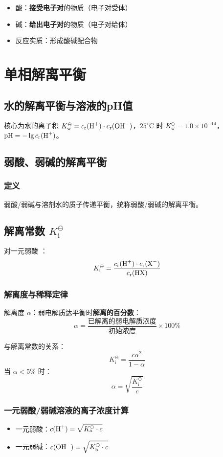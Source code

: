 \begin{itemize}
    \item 酸：\textbf{接受电子对}的物质（电子对受体）
    \item 碱：\textbf{给出电子对}的物质（电子对给体）
    \item 反应实质：形成酸碱配合物
\end{itemize}


\section{单相解离平衡}

\subsection{水的解离平衡与溶液的pH值}
核心为水的离子积 $K_{\text{w}}^{\ominus} = c_{\text{r}}(\ce{H+}) \cdot c_{\text{r}}(\ce{OH-})$，$25^\circ \text{C}$ 时 $K_{\text{w}}^{\ominus} = 1.0 \times 10^{-14}$，$\text{pH} = -\lg c_{\text{r}}(\ce{H+})$。

\subsection{弱酸、弱碱的解离平衡}
\subsubsection{定义}
弱酸/弱碱与溶剂水的质子传递平衡，统称弱酸/弱碱的解离平衡。

\subsection{解离常数 \texorpdfstring{$K_{\text{i}}^{\ominus}$}{}}
对一元弱酸 ：
$$K_{\text{i}}^{\ominus} = \frac{c_{\text{r}}(\ce{H+}) \cdot c_{\text{r}}(\ce{X-})}{c_{\text{r}}(\ce{HX})}$$

\subsubsection{解离度与稀释定律}
解离度 $\alpha$：弱电解质达平衡时\textbf{解离的百分数}：
$$\alpha = \frac{\text{已解离的弱电解质浓度}}{\text{初始浓度}} \times 100\%$$

与解离常数的关系：
$$K_{\text{i}}^{\ominus} = \frac{c\alpha^2}{1 - \alpha}$$
当 $\alpha < 5\%$ 时：
$$\alpha = \sqrt{\frac{K_{\text{i}}^{\ominus}}{c}}$$

\subsubsection{一元弱酸/弱碱溶液的离子浓度计算}
\begin{itemize}
    \item 一元弱酸：$c(\ce{H+}) = \sqrt{K_{\text{a}}^{\ominus} \cdot c}$
    \item 一元弱碱：$c(\ce{OH-}) = \sqrt{K_{\text{b}}^{\ominus} \cdot c}$
\end{itemize}

